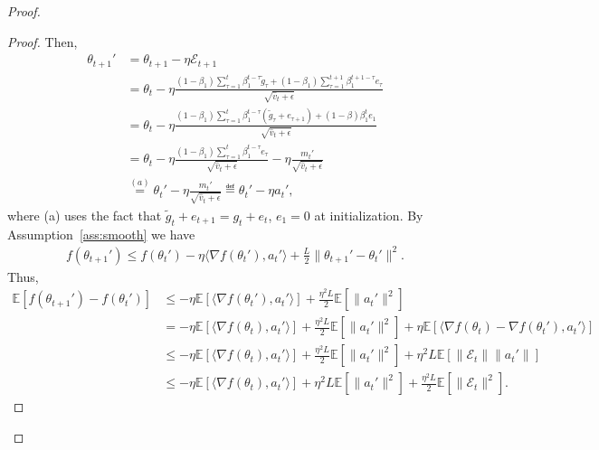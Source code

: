\documentclass[11pt]{article}
\begin{document}
\begin{proof}
\begin{proof}
Then, 
\begin{align*}
    \theta_{t+1}'&=\theta_{t+1}-\eta\mathcal E_{t+1}\\
    &=\theta_t-\eta\frac{(1-\beta_1)\sum_{\tau=1}^{t} \beta_1^{t-\tau}\tilde g_\tau+(1-\beta_1)\sum_{\tau=1}^{t+1} \beta_1^{t+1-\tau}e_\tau}{\sqrt{\hat v_t+\epsilon}}\\
    &=\theta_t-\eta\frac{(1-\beta_1)\sum_{\tau=1}^{t} \beta_1^{t-\tau}(\tilde g_\tau+e_{\tau+1})+(1-\beta)\beta_1^t e_1}{\sqrt{\hat v_t+\epsilon}}\\
    &=\theta_t-\eta\frac{(1-\beta_1)\sum_{\tau=1}^{t} \beta_1^{t-\tau} e_\tau}{\sqrt{\hat v_t+\epsilon}}-\eta\frac{m_t'}{\sqrt{\hat v_t+\epsilon}}\\
    &\overset{(a)}{=}\theta_t'-\eta\frac{m_t'}{\sqrt{\hat v_t+\epsilon}}\eqdef \theta_t'-\eta a_t',
\end{align*}
where (a) uses the fact that $\tilde g_t+e_{t+1}=g_t+e_t$, $e_1=0$ at initialization. By Assumption~\ref{ass:smooth} we have
\begin{align*}
    f(\theta_{t+1}')\leq f(\theta_t')-\eta\langle \nabla f(\theta_t'), a_t'\rangle+\frac{L}{2}\| \theta_{t+1}'-\theta_t'\|^2.
\end{align*}
Thus,
\begin{align}
    \mathbb E[f(\theta_{t+1}')-f(\theta_t')]&\leq -\eta\mathbb E[\langle \nabla f(\theta_t'), a_t'\rangle]+\frac{\eta^2L}{2}\mathbb E[\|a_t'\|^2]\\
    &=-\eta\mathbb E[\langle \nabla f(\theta_t), a_t'\rangle]+\frac{\eta^2L}{2}\mathbb E[\|a_t'\|^2]+\eta\mathbb E[\langle \nabla f(\theta_t)-\nabla f(\theta_t'),a_t'\rangle]\\
    &\leq -\eta\mathbb E[\langle \nabla f(\theta_t), a_t'\rangle]+\frac{\eta^2L}{2}\mathbb E[\|a_t'\|^2]+\eta^2 L\mathbb E[\| \mathcal E_t\| \|a_t'\|]\\
    &\leq -\eta\mathbb E[\langle \nabla f(\theta_t), a_t'\rangle]+\eta^2L \mathbb E[\|a_t'\|^2]+\frac{\eta^2 L}{2}\mathbb E[\| \mathcal E_t\|^2]. \label{eq0}
\end{align}


\end{proof}
\end{proof}
\end{document}
